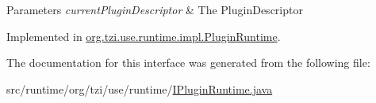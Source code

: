 \begin{DoxyParams}{Parameters}
{\em current\-Plugin\-Descriptor} & The Plugin\-Descriptor \\
\hline
\end{DoxyParams}


Implemented in \hyperlink{classorg_1_1tzi_1_1use_1_1runtime_1_1impl_1_1_plugin_runtime_af89264de1cc99d06ff1ef8a6c1abe755}{org.\-tzi.\-use.\-runtime.\-impl.\-Plugin\-Runtime}.



The documentation for this interface was generated from the following file\-:\begin{DoxyCompactItemize}
\item 
src/runtime/org/tzi/use/runtime/\hyperlink{_i_plugin_runtime_8java}{I\-Plugin\-Runtime.\-java}\end{DoxyCompactItemize}
